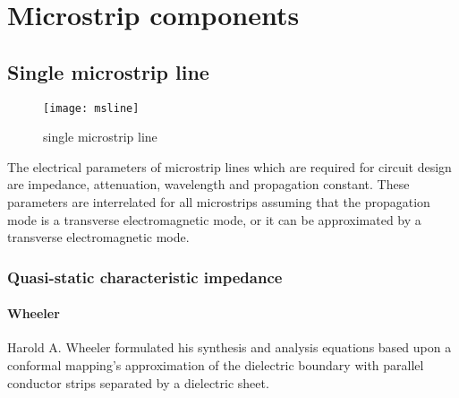 %
%
%
%

\chapter{Microstrip components}
\label{sec:MScomponents}

\section{Single microstrip line}

\begin{figure}[ht]
\begin{center}
\texttt{[image: msline]}
\end{center}
\caption{single microstrip line}
\label{fig:MSline}
\end{figure}
\FloatBarrier

The electrical parameters of microstrip lines which are required for
circuit design are impedance, attenuation, wavelength and propagation
constant.  These parameters are interrelated for all microstrips
assuming that the propagation mode is a transverse electromagnetic
mode, or it can be approximated by a transverse electromagnetic mode.

\subsection{Quasi-static characteristic impedance}

\subsubsection{Wheeler}

Harold A. Wheeler \cite{Wheeler2} formulated his synthesis and
analysis equations based upon a conformal mapping's approximation of
the dielectric boundary with parallel conductor strips separated by a
dielectric sheet.

